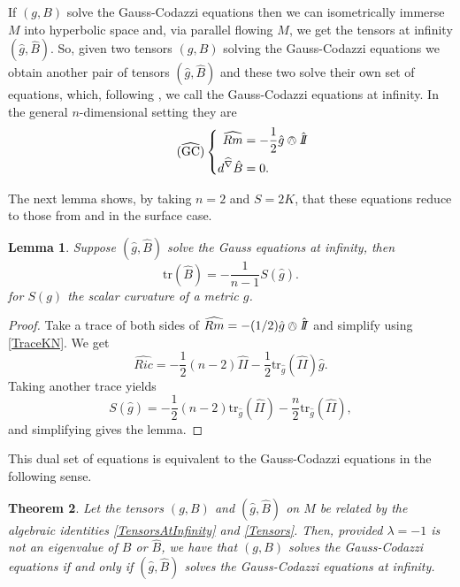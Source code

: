 \documentclass{amsart}
\newcommand{\two}{I\!\!I}
\newcommand{\tr}{\mathrm{tr}}
\newtheorem{thm}{Theorem}[section]
\newtheorem{lem}[thm]{Lemma}
\begin{document}
If $(g,B)$ solve the Gauss-Codazzi equations then we can isometrically immerse $M$ into hyperbolic space and, via parallel flowing $M$, we get the tensors at infinity $(\hat{g},\hat{B})$.
So, given two tensors $(g,B)$ solving the Gauss-Codazzi equations we obtain another pair of tensors $(\hat{g},\hat{B})$ and these two solve their own set of equations, which, following \cite{Krasnov-Schlenker2007}, we call the Gauss-Codazzi equations at infinity.
In the general $n$-dimensional setting they are 
\begin{equation}
\label{GCInf} \tag{$\widehat{\text{GC}}$}
\left\{
\begin{aligned}
\widehat{Rm} &= -\frac{1}{2} \hat{g} \owedge \hat{\two} \\
d^{\widehat{\nabla}} \hat{B} &= 0.
\end{aligned}
\right.
\end{equation}

The next lemma shows, by taking $n=2$ and $S = 2K$, that these equations reduce to those from \cite{Krasnov-Schlenker2008} and \cite{Bridgeman-Bromberg2022} in the surface case.

\begin{lem}
\label{TraceScalarCurv}
Suppose $(\hat{g},\hat{B})$ solve the Gauss equations at infinity, then 
\[
\tr(\hat{B}) = -\frac{1}{n-1}S(\hat{g}).
\]
for $S(g)$ the scalar curvature of a metric $g$.
\end{lem}

\begin{proof}
Take a trace of both sides of $\widehat{Rm} = -(1/2)\hat{g}\owedge\hat{\two}$ and simplify using \eqref{TraceKN}.
We get
\[
\widehat{Ric} = -\frac{1}{2}(n-2)\hat{\two} -\frac{1}{2}\tr_{\hat{g}}(\hat{\two})\hat{g}.
\]
Taking another trace yields
\[
S(\hat{g}) = -\frac{1}{2}(n-2)\tr_{\hat{g}}(\hat{\two}) - \frac{n}{2}\tr_{\hat{g}}(\hat{\two}),
\]
and simplifying gives the lemma.
\end{proof}


This dual set of equations is equivalent to the Gauss-Codazzi equations in the following sense.


\begin{thm}
\label{DualEquations}
Let the tensors $(g,B)$ and $(\hat{g},\hat{B})$ on $M$ be related by the algebraic identities \eqref{TensorsAtInfinity} and \eqref{Tensors}. 
Then, provided $\lambda =-1$ is not an eigenvalue of $B$ or $\hat{B}$, we have that $(g,B)$ solves the Gauss-Codazzi equations if and only if $(\hat{g},\hat{B})$ solves the Gauss-Codazzi equations at infinity.
\end{thm}
\end{document}
